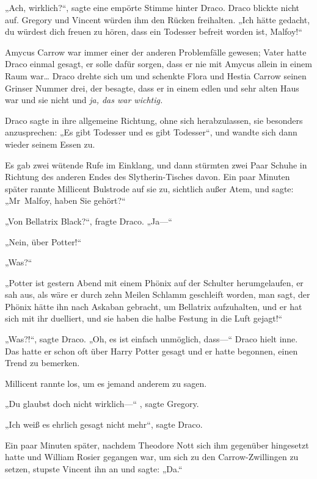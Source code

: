 {„Ach, wirklich?“, sagte eine empörte Stimme hinter Draco. Draco blickte nicht auf. Gregory und Vincent würden ihm den Rücken freihalten. „Ich hätte gedacht, du würdest dich freuen zu hören, dass ein Todesser befreit worden ist, Malfoy!“

Amycus Carrow war immer einer der anderen Problemfälle gewesen; Vater hatte Draco einmal gesagt, er solle dafür sorgen, dass er nie mit Amycus allein in einem Raum war… Draco drehte sich um und schenkte Flora und Hestia Carrow seinen Grinser Nummer drei, der besagte, dass er in einem edlen und sehr alten Haus war und sie nicht und \emph{ja, das war wichtig.}

Draco sagte in ihre allgemeine Richtung, ohne sich herabzulassen, sie besonders anzusprechen: „Es gibt Todesser und es gibt Todesser“, und wandte sich dann wieder seinem Essen zu.

Es gab zwei wütende Rufe im Einklang, und dann stürmten zwei Paar Schuhe in Richtung des anderen Endes des Slytherin-Tisches davon. Ein paar Minuten später rannte Millicent Bulstrode auf sie zu, sichtlich außer Atem, und sagte: „Mr~Malfoy, haben Sie gehört?“

„Von Bellatrix Black?“, fragte Draco. „Ja—“

„Nein, über Potter!“

„Was?“

„Potter ist gestern Abend mit einem Phönix auf der Schulter herumgelaufen, er sah aus, als wäre er durch zehn Meilen Schlamm geschleift worden, man sagt, der Phönix hätte ihn nach Askaban gebracht, um Bellatrix aufzuhalten, und er hat sich mit ihr duelliert, und sie haben die halbe Festung in die Luft gejagt!“

„Was?!“, sagte Draco. „Oh, es ist einfach unmöglich, dass—“ Draco hielt inne. Das hatte er schon oft über Harry Potter gesagt und er hatte begonnen, einen Trend zu bemerken.

Millicent rannte los, um es jemand anderem zu sagen.

„Du glaubst doch nicht wirklich—“ , sagte Gregory.

„Ich weiß es ehrlich gesagt nicht mehr“, sagte Draco.

Ein paar Minuten später, nachdem Theodore Nott sich ihm gegenüber hingesetzt hatte und William Rosier gegangen war, um sich zu den Carrow-Zwillingen zu setzen, stupste Vincent ihn an und sagte: „Da.“

}
